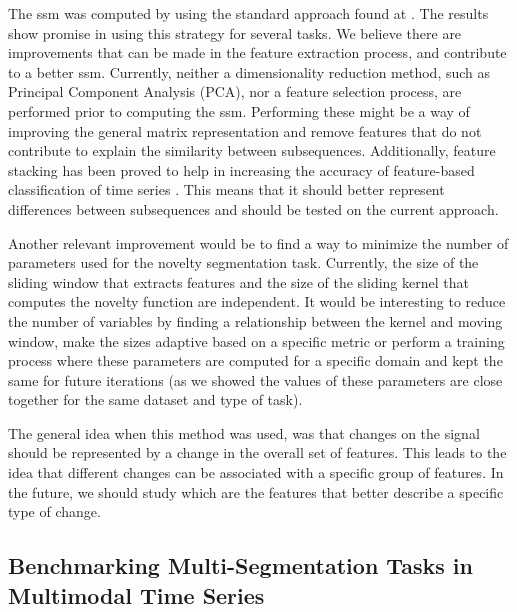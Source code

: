The \gls{ssm} was computed by using the standard approach found at \cite{fmp1}. The results show promise in using this strategy for several tasks. We believe there are improvements that can be made in the feature extraction process, and contribute to a better \gls{ssm}. Currently, neither a dimensionality reduction method, such as Principal Component Analysis (PCA), nor a feature selection process, are performed prior to computing the \gls{ssm}. Performing these might be a way of improving the general matrix representation and remove features that do not contribute to explain the similarity between subsequences. Additionally, feature stacking has been proved to help in increasing the accuracy of feature-based classification of time series \cite{hartmann2021featurespace}. This means that it should better represent differences between subsequences and should be tested on the current approach.
\par
Another relevant improvement would be to find a way to minimize the number of parameters used for the novelty segmentation task. Currently, the size of the sliding window that extracts features and the size of the sliding kernel that computes the novelty function are independent. It would be interesting to reduce the number of variables by finding a relationship between the kernel and moving window, make the sizes adaptive based on a specific metric or perform a training process where these parameters are computed for a specific domain and kept the same for future iterations (as we showed the values of these parameters are close together for the same dataset and type of task).
\par
The general idea when this method was used, was that changes on the signal should be represented by a change in the overall set of features. This leads to the idea that different changes can be associated with a specific group of features. In the future, we should study which are the features that better describe a specific type of change.

\subsection{Benchmarking Multi-Segmentation Tasks in Multimodal Time Series}

